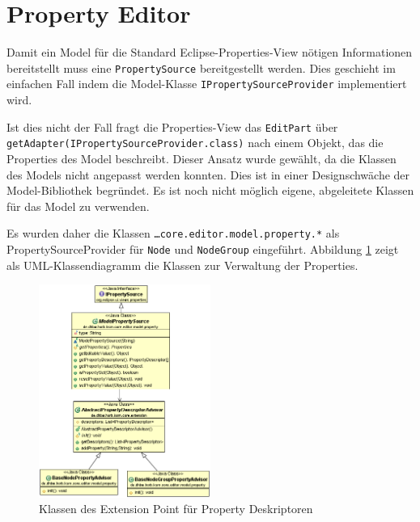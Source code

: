 \documentclass[%
12pt,titlepage,abstracton,DIV=10,BCOR=0.5cm]{scrreprt}
\begin{document}
\section{Property Editor}
Damit ein Model für die Standard Eclipse-Properties-View nötigen Informationen
bereitstellt muss eine \texttt{Prop\-erty\-Source} bereitgestellt werden. Dies geschieht im
einfachen Fall indem die Model-Klasse \texttt{IProp\-erty\-Source\-Provider}
implementiert wird.

Ist dies nicht der Fall fragt die Properties-View das \texttt{EditPart} über
\texttt{getAdapter\-(IProp\-erty\-Source\-Provider.class)} nach einem Objekt,
das die Properties des Model beschreibt. Dieser Ansatz wurde gewählt, da die
Klassen des Models nicht angepasst werden konnten. Dies ist in einer
Designschwäche der Model-Bibliothek begründet. Es ist noch nicht möglich eigene,
abgeleitete Klassen für das Model zu verwenden.

Es wurden daher die Klassen \texttt{\ldots core.\-editor.\-model.\-property.*}
als PropertySourceProvider für \texttt{Node} und \texttt{NodeGroup} eingeführt.
Abbildung \ref{fig:ext-property-descriptors} zeigt als UML-Klassendiagramm die
Klassen zur Verwaltung der Properties.

\begin{figure}[mt]
\centering
\includegraphics[width=0.5\textwidth]{images/ext-property-descriptors.PNG}
\caption{Klassen des Extension Point für Property Deskriptoren}
\label{fig:ext-property-descriptors}
\end{figure}
\end{document}
